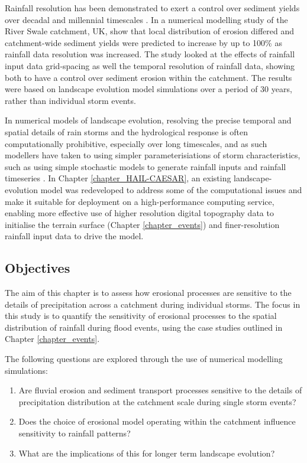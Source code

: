 Rainfall resolution has been demonstrated to exert a control over sediment yields over decadal and millennial timescales \citep{coulthard2016sensitivity}. In a numerical modelling study of the River Swale catchment, UK, \citet{coulthard2016sensitivity} show that local distribution of erosion differed and catchment-wide sediment yields were predicted to increase by up to 100\% as rainfall data resolution was increased. The study looked at the effects of rainfall input data grid-spacing as well the temporal resolution of rainfall data, showing both to have a control over sediment erosion within the catchment. The results were based on landscape evolution model simulations over a period of 30 years, rather than individual storm events.

In numerical models of landscape evolution, resolving the precise temporal and spatial details of rain storms and the hydrological response is often computationally prohibitive, especially over long timescales, and as such modellers have taken to using simpler parameterisiations of storm characteristics, such as using simple stochastic models to generate rainfall inputs and rainfall timeseries \citep{Eagleson1978,Tucker2001}. In Chapter \ref{chapter_HAIL-CAESAR}, an existing landscape-evolution model was redeveloped to address some of the computational issues and make it suitable for deployment on a high-performance computing service, enabling more effective use of higher resolution digital topography data to initialise the terrain surface (Chapter \ref{chapter_events}) and finer-resolution rainfall input data to drive the model.

\subsection{Objectives}
The aim of this chapter is to assess how erosional processes are sensitive to the details of precipitation across a catchment during individual storms. The focus in this study is to quantify the sensitivity of erosional processes to the spatial distribution of rainfall during flood events, using the case studies outlined in Chapter \ref{chapter_events}.

The following questions are explored through the use of numerical modelling simulations:

\begin{enumerate}
\item Are fluvial erosion and sediment transport processes sensitive to the details of precipitation distribution at the catchment scale during single storm events?
\item Does the choice of erosional model operating within the catchment influence sensitivity to rainfall patterns? 
\item What are the implications of this for longer term landscape evolution? 
\end{enumerate}


